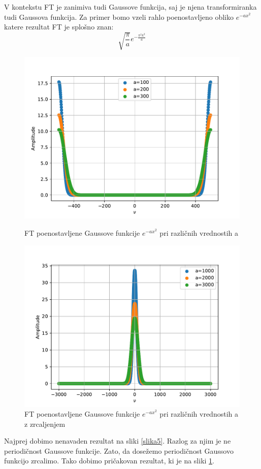 \documentclass{article}
\begin{document}
V kontekstu FT je zanimiva tudi Gaussove funkcija, saj je njena transformiranka tudi Gaussova funkcija. Za primer bomo vzeli rahlo poenostavljeno obliko $e^{-ax^2}$ katere rezultat FT je splošno znan:
\begin{equation*}
	\sqrt{\frac{\pi}{a}} e^{-\frac{\pi^2 k^2}{a}}
\end{equation*}
\begin{figure}[H]
    \centering
    \begin{minipage}{0.48\textwidth}
        \centering
        \includegraphics[width=\textwidth]{nomirrorgauss.pdf}
		\caption{FT poenostavljene Gaussove funkcije $e^{-ax^2}$ pri različnih vrednostih a}
		\label{slika5}
    \end{minipage}
    \hfill
    \begin{minipage}{0.48\textwidth}
        \centering
        \includegraphics[width=\textwidth]{gauss.pdf}
	\caption{FT poenostavljene Gaussove funkcije $e^{-ax^2}$ pri različnih vrednostih a z zrcaljenjem}
		\label{slika6}
    \end{minipage}
\end{figure}
Najprej dobimo nenavaden rezultat na sliki \ref{slika5}. Razlog za njim je ne periodičnost Gaussove funkcije. Zato, da dosežemo periodičnost Gaussovo funkcijo zrcalimo. Tako dobimo pričakovan rezultat, ki je na sliki \ref{slika6}.
\end{document}
